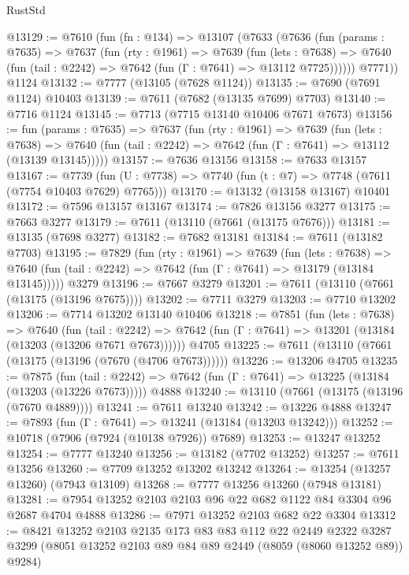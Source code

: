 \begin{lexlean}{RustStd}
\begin{coremodule}
{\begin{coremodule}
{{{{{{{{{{{{{{{{{{{{{{{{{{{{{{{{{{@13129 := @7610
    (fun (fn : @134) =>
    @13107
      (@7633
        (@7636
          (fun (params : @7635) =>
          @7637
            (fun (rty : @1961) =>
            @7639
              (fun (lets : @7638) =>
              @7640 (fun (tail : @2242) => @7642 (fun (Γ : @7641) => @13112 @7725))))))
        @7771))
    @1124
@13132 := @7777 (@13105 (@7628 @1124))
@13135 := @7690 (@7691 @1124) @10403
@13139 := @7611 (@7682 (@13135 @7699) @7703)
@13140 := @7716 @1124
@13145 := @7713 (@7715 @13140 @10406 @7671 @7673)
@13156 := fun (params : @7635) =>
  @7637
    (fun (rty : @1961) =>
    @7639
      (fun (lets : @7638) =>
      @7640 (fun (tail : @2242) => @7642 (fun (Γ : @7641) => @13112 (@13139 @13145)))))
@13157 := @7636 @13156
@13158 := @7633 @13157
@13167 := @7739
    (fun (U : @7738) => @7740 (fun (t : @7) => @7748 (@7611 (@7754 @10403 @7629) @7765)))
@13170 := @13132 (@13158 @13167) @10401
@13172 := @7596 @13157 @13167
@13174 := @7826 @13156 @3277
@13175 := @7663 @3277
@13179 := @7611 (@13110 (@7661 (@13175 @7676)))
@13181 := @13135 (@7698 @3277)
@13182 := @7682 @13181
@13184 := @7611 (@13182 @7703)
@13195 := @7829
    (fun (rty : @1961) =>
    @7639
      (fun (lets : @7638) =>
      @7640 (fun (tail : @2242) => @7642 (fun (Γ : @7641) => @13179 (@13184 @13145)))))
    @3279
@13196 := @7667 @3279
@13201 := @7611 (@13110 (@7661 (@13175 (@13196 @7675))))
@13202 := @7711 @3279
@13203 := @7710 @13202
@13206 := @7714 @13202 @13140 @10406
@13218 := @7851
    (fun (lets : @7638) =>
    @7640
      (fun (tail : @2242) =>
      @7642 (fun (Γ : @7641) => @13201 (@13184 (@13203 (@13206 @7671 @7673))))))
    @4705
@13225 := @7611 (@13110 (@7661 (@13175 (@13196 (@7670 (@4706 @7673))))))
@13226 := @13206 @4705
@13235 := @7875
    (fun (tail : @2242) => @7642 (fun (Γ : @7641) => @13225 (@13184 (@13203 (@13226 @7673)))))
    @4888
@13240 := @13110 (@7661 (@13175 (@13196 (@7670 @4889))))
@13241 := @7611 @13240
@13242 := @13226 @4888
@13247 := @7893 (fun (Γ : @7641) => @13241 (@13184 (@13203 @13242)))
@13252 := @10718 (@7906 (@7924 (@10138 @7926)) @7689)
@13253 := @13247 @13252
@13254 := @7777 @13240
@13256 := @13182 (@7702 @13252)
@13257 := @7611 @13256
@13260 := @7709 @13252 @13202 @13242
@13264 := @13254 (@13257 @13260) (@7943 @13109)
@13268 := @7777 @13256 @13260 (@7948 @13181)
@13281 := @7954 @13252 @2103 @2103 @96 @22 @682 @1122 @84 @3304 @96 @2687 @4704 @4888
@13286 := @7971 @13252 @2103 @682 @22 @3304
@13312 := @8421
    @13252
    @2103
    @2135
    @173
    @83
    @83
    @112
    @22
    @2449
    @2322
    @3287
    @3299
    (@8051 @13252 @2103 @89 @84 @89 @2449 (@8059 (@8060 @13252 @89)) @9284)
}}}}}}}}}}}}}}}}}}}}}}}}}}}}}}}}}}
\end{coremodule}}
\end{coremodule}
\end{lexlean}
